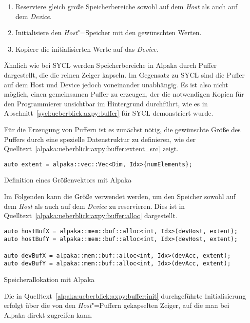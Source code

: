 \begin{enumerate}
    \item Reserviere gleich große Speicherbereiche sowohl auf dem \textit{Host}
          als auch auf dem \textit{Device}.
    \item Initialisiere den \textit{Host}"=Speicher mit den gewünschten Werten.
    \item Kopiere die initialisierten Werte auf das \textit{Device}.
\end{enumerate}

Ähnlich wie bei SYCL werden Speicherbereiche in Alpaka durch Puffer dargestellt,
die die reinen Zeiger kapseln. Im Gegensatz zu SYCL sind die Puffer auf dem Host
und Device jedoch voneinander unabhängig. Es ist also nicht möglich, einen
gemeinsamen Puffer zu erzeugen, der die notwendigen Kopien für den Programmierer
unsichtbar im Hintergrund durchführt, wie es in
Abschnitt~\ref{sycl:ueberblick:axpy:buffer} für SYCL demonstriert wurde.

Für die Erzeugung von Puffern ist es zunächst nötig, die gewünschte Größe des
Puffers durch eine spezielle Datenstruktur zu definieren, wie der
Quelltext~\ref{alpaka:ueberblick:axpy:buffer:extent_src} zeigt.

\begin{code}
    \begin{verbatim}
auto extent = alpaka::vec::Vec<Dim, Idx>{numElements};
    \end{verbatim}
    \caption{Definition eines Größenvektors mit Alpaka}
    \label{alpaka:ueberblick:axpy:buffer:extent_src}
\end{code}
\vspace{4mm}
Im Folgenden kann die Größe verwendet werden, um den Speicher sowohl auf dem
\textit{Host} als auch auf dem \textit{Device} zu reservieren. Dies ist in
Quelltext~\ref{alpaka:ueberblick:axpy:buffer:alloc} dargestellt.

\begin{code}
    \begin{verbatim}
auto hostBufX = alpaka::mem::buf::alloc<int, Idx>(devHost, extent);
auto hostBufY = alpaka::mem::buf::alloc<int, Idx>(devHost, extent);

auto devBufX = alpaka::mem::buf::alloc<int, Idx>(devAcc, extent);
auto devBufY = alpaka::mem::buf::alloc<int, Idx>(devAcc, extent);
    \end{verbatim}
    \caption{Speicherallokation mit Alpaka}
    \label{alpaka:ueberblick:axpy:buffer:alloc}
\end{code}
\vspace{4mm}
Die in Quelltext~\ref{alpaka:ueberblick:axpy:buffer:init} durchgeführte
Initialisierung erfolgt über die von den \textit{Host}"=Puffern gekapselten
Zeiger, auf die man bei Alpaka direkt zugreifen kann.

